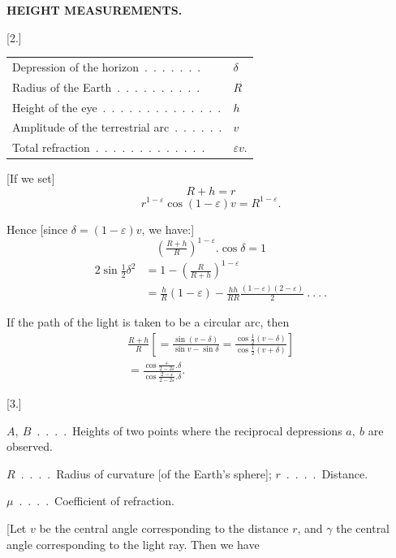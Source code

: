 \par\clearpage
\noindent\null\hfill{\small\textbf{HEIGHT MEASUREMENTS.}}\hfill{}\par\medskip
\begingroup
\setlength{\abovedisplayskip}{5pt}\setlength{\belowdisplayskip}{5pt}
\begin{center}
[2.]\par\medskip
\begin{tabular}{l@{\ }l}
Depression of the horizon\ .\ .\ .\ .\ .\ .\ .&\(\delta\)\\
Radius of the Earth\ .\ .\ .\ .\ .\ .\ .\ .\ .\ .&\(R\)\\
Height of the eye\ .\ .\ .\ .\ .\ .\ .\ .\ .\ .\ .\ .\ .\ .&\(h\)\\
Amplitude of the terrestrial arc\ .\ .\ .\ .\ .\ .&\(v\)\\
Total refraction\ .\ .\ .\ .\ .\ .\ .\ .\ .\ .\ .\ .\ .&\(\varepsilon v\).
\end{tabular}
\end{center}
\par\noindent\hspace*{\parindent}[If we set]
\[R+h=r\]
\noindent [then:]
\[r^{1-\varepsilon}\cos(1-\varepsilon)v=R^{1-\varepsilon}.\]
\par\noindent\hspace*{\parindent}Hence [since \(\delta=(1-\varepsilon)v\), we have:]
\[\left(\tfrac{R+h}{R}\right)^{1-\varepsilon}.\cos\delta=1\]
\noindent [or]
\[\begin{aligned}
2\sin\tfrac12\delta^2&=1-\left(\tfrac{R}{R+h}\right)^{1-\varepsilon}\\
&=\tfrac{h}{R}(1-\varepsilon)-\tfrac{hh}{RR}\tfrac{(1-\varepsilon)(2-\varepsilon)}{2}\ .\ .\ .\ .
\end{aligned}\]
\par\noindent\hspace*{\parindent}If the path of the light is taken to be a circular arc, then
\[\begin{aligned}
\tfrac{R+h}{R}\left[=\tfrac{\sin(v-\delta)}{\sin v-\sin\delta}=\tfrac{\cos\frac12(v-\delta)}{\cos\frac12(v+\delta)}\right]\\
=\frac{\cos\tfrac{\varepsilon}{2-2\varepsilon}.\delta}{\cos\tfrac{2-\varepsilon}{2-2\varepsilon}.\delta}.
\end{aligned}\]
\begin{center}[3.]\end{center}
\par\noindent\hspace*{\parindent}\(A,\ B\)\ .\ .\ .\ .\ Heights of two points where the reciprocal depressions
\(a,\ b\) are observed.
\par\noindent\hspace*{\parindent}\(R\)\ .\ .\ .\ .\ Radius of curvature [of the Earth's sphere]; \(r\)\ .\ .\ .\ .\ Distance.
\begin{center}\(\mu\)\ .\ .\ .\ .\ Coefficient of refraction.\end{center}
\par\noindent\hspace*{\parindent}[Let \(v\) be the central angle corresponding to the distance \(r\), and \(\gamma\)
the central angle corresponding to the light ray. Then we have
\endgroup
